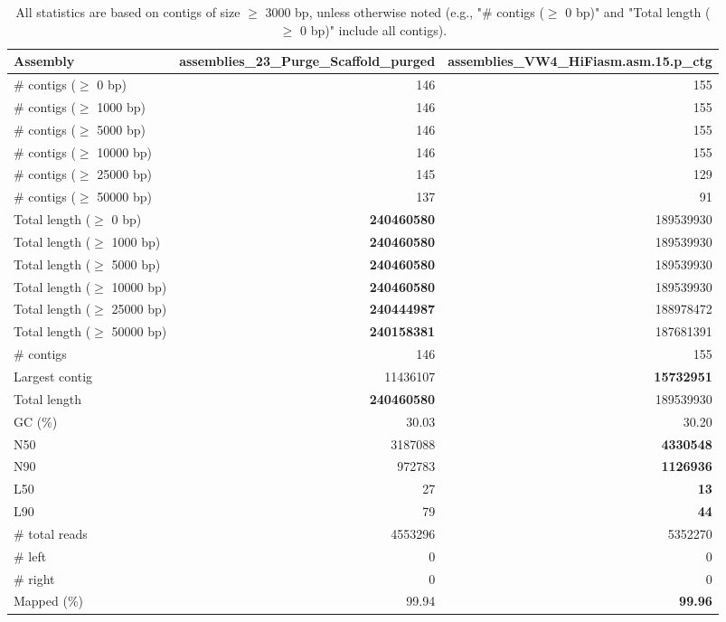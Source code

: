 \documentclass[12pt,a4paper]{article}
\begin{document}
\begin{table}[ht]
\begin{center}
\caption{All statistics are based on contigs of size $\geq$ 3000 bp, unless otherwise noted (e.g., "\# contigs ($\geq$ 0 bp)" and "Total length ($\geq$ 0 bp)" include all contigs).}
\begin{tabular}{|l*{2}{|r}|}
\hline
Assembly & assemblies\_23\_Purge\_Scaffold\_purged & assemblies\_VW4\_HiFiasm.asm.15.p\_ctg \\ \hline
\# contigs ($\geq$ 0 bp) & 146 & 155 \\ \hline
\# contigs ($\geq$ 1000 bp) & 146 & 155 \\ \hline
\# contigs ($\geq$ 5000 bp) & 146 & 155 \\ \hline
\# contigs ($\geq$ 10000 bp) & 146 & 155 \\ \hline
\# contigs ($\geq$ 25000 bp) & 145 & 129 \\ \hline
\# contigs ($\geq$ 50000 bp) & 137 & 91 \\ \hline
Total length ($\geq$ 0 bp) & {\bf 240460580} & 189539930 \\ \hline
Total length ($\geq$ 1000 bp) & {\bf 240460580} & 189539930 \\ \hline
Total length ($\geq$ 5000 bp) & {\bf 240460580} & 189539930 \\ \hline
Total length ($\geq$ 10000 bp) & {\bf 240460580} & 189539930 \\ \hline
Total length ($\geq$ 25000 bp) & {\bf 240444987} & 188978472 \\ \hline
Total length ($\geq$ 50000 bp) & {\bf 240158381} & 187681391 \\ \hline
\# contigs & 146 & 155 \\ \hline
Largest contig & 11436107 & {\bf 15732951} \\ \hline
Total length & {\bf 240460580} & 189539930 \\ \hline
GC (\%) & 30.03 & 30.20 \\ \hline
N50 & 3187088 & {\bf 4330548} \\ \hline
N90 & 972783 & {\bf 1126936} \\ \hline
L50 & 27 & {\bf 13} \\ \hline
L90 & 79 & {\bf 44} \\ \hline
\# total reads & 4553296 & 5352270 \\ \hline
\# left & 0 & 0 \\ \hline
\# right & 0 & 0 \\ \hline
Mapped (\%) & 99.94 & {\bf 99.96} \\ \hline

\end{tabular}
\end{center}
\end{table}
\end{document}
